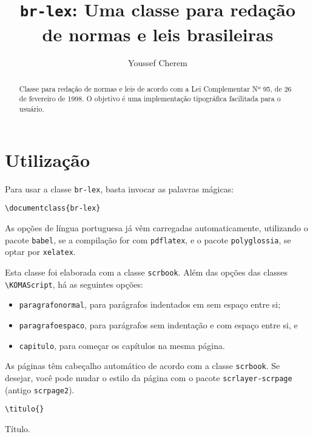\documentclass{ltxdoc}
\title{\texttt{br-lex}: Uma classe para redação\\ de normas e leis brasileiras}
\author{Youssef Cherem}
\newcommand{\nota}[1]{\marginpar{\hfill \cmd{#1}}}
\begin{document}
\maketitle

\begin{abstract}
Classe para redação de normas e leis de acordo com a Lei Complementar Nº 95, de 26 de fevereiro de 1998. O objetivo é uma implementação tipográfica facilitada para o usuário.
\end{abstract}

\section{Utilização}

Para usar a classe \texttt{br-lex}, basta invocar as palavras mágicas: 

\begin{verbatim}
\documentclass{br-lex}
\end{verbatim}

As opções de língua portuguesa já vêm carregadas automaticamente, utilizando o pacote \texttt{babel}, se a compilação for com \texttt{pdflatex}, e o pacote \texttt{polyglossia}, se optar por \texttt{xelatex}. 

Esta classe foi elaborada com a classe \texttt{scrbook}. Além das opções das classes \verb|\KOMAScript|, há as seguintes opções: 

\begin{itemize}

\item 
\texttt{paragrafonormal}, para parágrafos indentados em sem espaço entre si; 

\item
\texttt{paragrafoespaco}, para parágrafos sem indentação e com espaço entre si, e 

\item 
\texttt{capitulo}, para começar os capítulos na mesma página.

\end{itemize}

As páginas têm cabeçalho automático de acordo com a classe \texttt{scrbook}. Se desejar, você pode mudar o estilo da página com o pacote \texttt{scrlayer-scrpage} (antigo \texttt{scrpage2}).



\begin{verbatim}\titulo{}
\end{verbatim}
\nota{\titulo\marg{Título}} 
Título.
\end{document}
